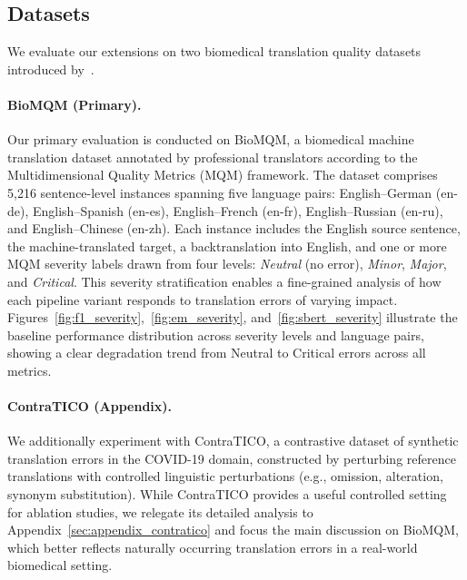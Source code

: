 
\subsection{Datasets}
\label{sec:datasets}

We evaluate our extensions on two biomedical translation quality datasets introduced by~\citet{ki-etal-2025-askqe}.

\paragraph{BioMQM (Primary).}
Our primary evaluation is conducted on BioMQM, a biomedical machine translation dataset annotated by professional translators according to the Multidimensional Quality Metrics (MQM) framework. The dataset comprises 5{,}216 sentence-level instances spanning five language pairs: English--German (en-de), English--Spanish (en-es), English--French (en-fr), English--Russian (en-ru), and English--Chinese (en-zh). Each instance includes the English source sentence, the machine-translated target, a backtranslation into English, and one or more MQM severity labels drawn from four levels: \textit{Neutral} (no error), \textit{Minor}, \textit{Major}, and \textit{Critical}. This severity stratification enables a fine-grained analysis of how each pipeline variant responds to translation errors of varying impact. Figures~\ref{fig:f1_severity},~\ref{fig:em_severity}, and~\ref{fig:sbert_severity} illustrate the baseline performance distribution across severity levels and language pairs, showing a clear degradation trend from Neutral to Critical errors across all metrics.

\paragraph{ContraTICO (Appendix).}
We additionally experiment with ContraTICO, a contrastive dataset of synthetic translation errors in the COVID-19 domain, constructed by perturbing reference translations with controlled linguistic perturbations (e.g., omission, alteration, synonym substitution). While ContraTICO provides a useful controlled setting for ablation studies, we relegate its detailed analysis to Appendix~\ref{sec:appendix_contratico} and focus the main discussion on BioMQM, which better reflects naturally occurring translation errors in a real-world biomedical setting.

